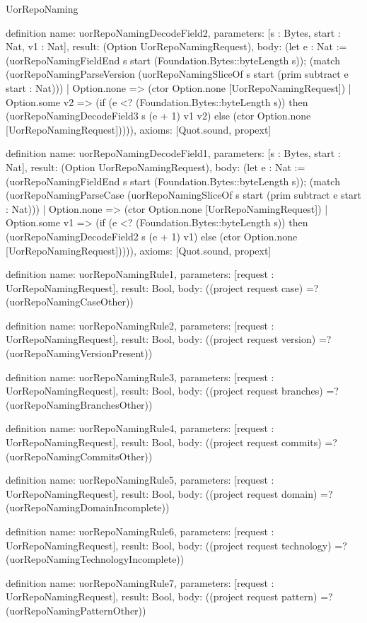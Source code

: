 \begin{lexlean}{UorRepoNaming}
\begin{semanticmodule}
definition{
  name: uorRepoNamingDecodeField2,
  parameters: [s : Bytes, start : Nat, v1 : Nat],
  result: (Option UorRepoNamingRequest),
  body: (let e : Nat := (uorRepoNamingFieldEnd s start (Foundation.Bytes::byteLength s)); (match (uorRepoNamingParseVersion (uorRepoNamingSliceOf s start (prim subtract e start : Nat)))
    | Option.none => (ctor Option.none [UorRepoNamingRequest])
    | Option.some v2 => (if (e <? (Foundation.Bytes::byteLength s)) then (uorRepoNamingDecodeField3 s (e + 1) v1 v2) else (ctor Option.none [UorRepoNamingRequest])))),
  axioms: [Quot.sound, propext]
}

definition{
  name: uorRepoNamingDecodeField1,
  parameters: [s : Bytes, start : Nat],
  result: (Option UorRepoNamingRequest),
  body: (let e : Nat := (uorRepoNamingFieldEnd s start (Foundation.Bytes::byteLength s)); (match (uorRepoNamingParseCase (uorRepoNamingSliceOf s start (prim subtract e start : Nat)))
    | Option.none => (ctor Option.none [UorRepoNamingRequest])
    | Option.some v1 => (if (e <? (Foundation.Bytes::byteLength s)) then (uorRepoNamingDecodeField2 s (e + 1) v1) else (ctor Option.none [UorRepoNamingRequest])))),
  axioms: [Quot.sound, propext]
}

definition{
  name: uorRepoNamingRule1,
  parameters: [request : UorRepoNamingRequest],
  result: Bool,
  body: ((project request case) =? (uorRepoNamingCaseOther))
}

definition{
  name: uorRepoNamingRule2,
  parameters: [request : UorRepoNamingRequest],
  result: Bool,
  body: ((project request version) =? (uorRepoNamingVersionPresent))
}

definition{
  name: uorRepoNamingRule3,
  parameters: [request : UorRepoNamingRequest],
  result: Bool,
  body: ((project request branches) =? (uorRepoNamingBranchesOther))
}

definition{
  name: uorRepoNamingRule4,
  parameters: [request : UorRepoNamingRequest],
  result: Bool,
  body: ((project request commits) =? (uorRepoNamingCommitsOther))
}

definition{
  name: uorRepoNamingRule5,
  parameters: [request : UorRepoNamingRequest],
  result: Bool,
  body: ((project request domain) =? (uorRepoNamingDomainIncomplete))
}

definition{
  name: uorRepoNamingRule6,
  parameters: [request : UorRepoNamingRequest],
  result: Bool,
  body: ((project request technology) =? (uorRepoNamingTechnologyIncomplete))
}

definition{
  name: uorRepoNamingRule7,
  parameters: [request : UorRepoNamingRequest],
  result: Bool,
  body: ((project request pattern) =? (uorRepoNamingPatternOther))
}


\end{semanticmodule}
\end{lexlean}
